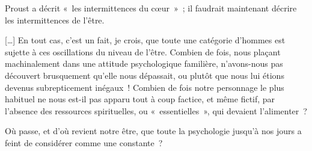 {Proust a décrit «~les intermittences du cœur~»~; il faudrait
maintenant décrire les intermittences de l'être.

[…] En tout cas, c'est un fait, je crois, que toute une catégorie
d'hommes est sujette à ces oscillations du niveau de l'être. Combien
de fois, nous plaçant machinalement dans une attitude psychologique
familière, n'avons-nous pas découvert brusquement qu'elle nous
dépassait, ou plutôt que nous lui étions devenus subrepticement
inégaux~! Combien de fois notre personnage le plus habituel ne nous
est-il pas apparu tout à coup factice, et même fictif, par l'absence
des ressources spirituelles, ou «~essentielles~», qui devaient
l'alimenter~?

Où passe, et d'où revient notre être, que toute la psychologie jusqu'à nos jours a feint de considérer comme une constante~?
}


